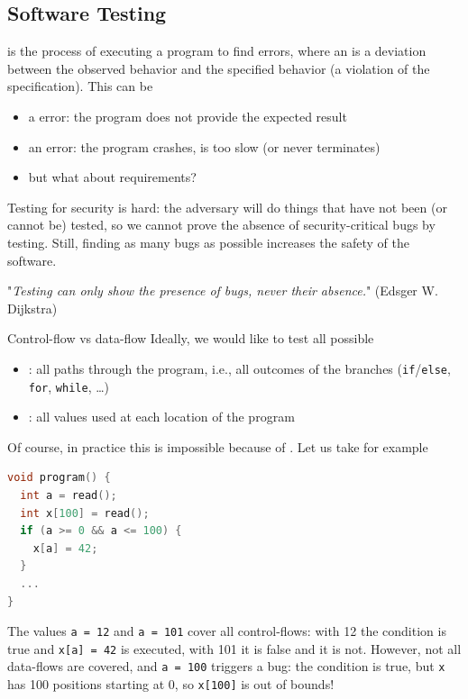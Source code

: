 \subsection{Software Testing}
 is the process of executing a program to find errors, where an  is a deviation between the observed behavior and the specified behavior (a violation of the specification). This can be
\begin{itemize}
    \item a  error: the program does not provide the expected result
    \item an  error: the program crashes, is too slow (or never terminates)
    \item but what about  requirements?
\end{itemize}
Testing for security is hard: the adversary will do things that have not been (or cannot be) tested, so we cannot prove the absence of security-critical bugs by testing. Still, finding as many bugs as possible increases the safety of the software.
\begin{center}
    "\textit{Testing can only show the presence of bugs, never their absence.}" (Edsger W. Dijkstra)
\end{center}

\begin{parag}{Control-flow vs data-flow}
    Ideally, we would like to test all possible
    \begin{itemize}
        \item {}: all paths through the program, i.e., all outcomes of the branches (\texttt{if}/\texttt{else}, \texttt{for}, \texttt{while}, \dots)
        \item {}: all values used at each location of the program
    \end{itemize}
    Of course, in practice this is impossible because of . Let us take for example
    \begin{lstlisting}[language=C]
void program() {
  int a = read();
  int x[100] = read();
  if (a >= 0 && a <= 100) {
    x[a] = 42;
  }
  ...
}
    \end{lstlisting}
    The values \texttt{a = 12} and \texttt{a = 101} cover all control-flows: with 12 the condition is true and \texttt{x[a] = 42} is executed, with 101 it is false and it is not. However, not all data-flows are covered, and \texttt{a = 100} triggers a bug: the condition is true, but \texttt{x} has 100 positions starting at 0, so \texttt{x[100]} is out of bounds!
\end{parag}

